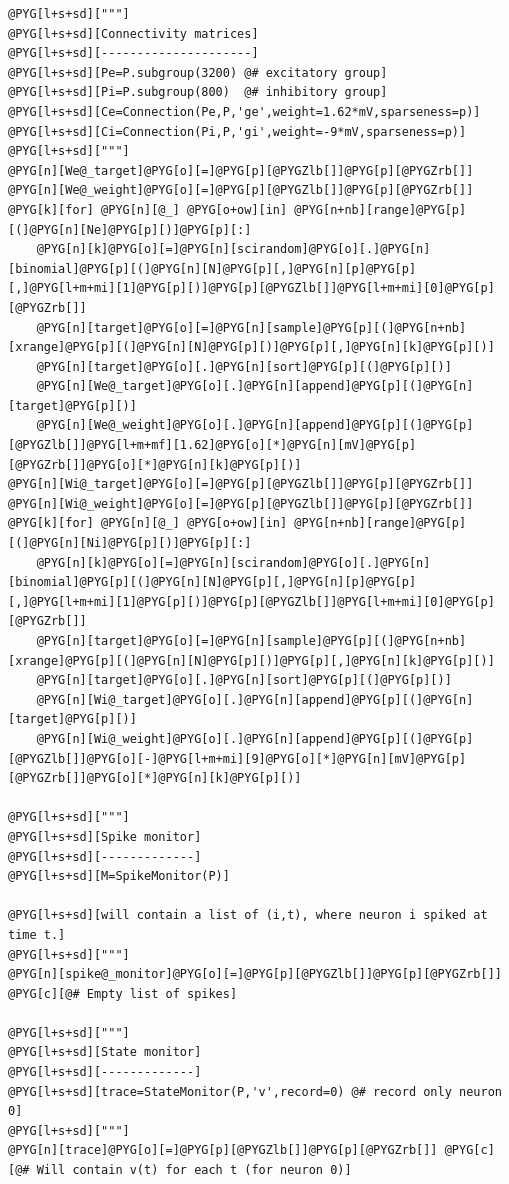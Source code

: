 \documentclass[letterpaper,10pt,english]{manual}
\begin{document}
\begin{Verbatim}[commandchars=@\[\]]
@PYG[l+s+sd]["""]
@PYG[l+s+sd][Connectivity matrices]
@PYG[l+s+sd][---------------------]
@PYG[l+s+sd][Pe=P.subgroup(3200) @# excitatory group]
@PYG[l+s+sd][Pi=P.subgroup(800)  @# inhibitory group]
@PYG[l+s+sd][Ce=Connection(Pe,P,'ge',weight=1.62*mV,sparseness=p)]
@PYG[l+s+sd][Ci=Connection(Pi,P,'gi',weight=-9*mV,sparseness=p)]
@PYG[l+s+sd]["""]
@PYG[n][We@_target]@PYG[o][=]@PYG[p][@PYGZlb[]]@PYG[p][@PYGZrb[]]
@PYG[n][We@_weight]@PYG[o][=]@PYG[p][@PYGZlb[]]@PYG[p][@PYGZrb[]]
@PYG[k][for] @PYG[n][@_] @PYG[o+ow][in] @PYG[n+nb][range]@PYG[p][(]@PYG[n][Ne]@PYG[p][)]@PYG[p][:]
    @PYG[n][k]@PYG[o][=]@PYG[n][scirandom]@PYG[o][.]@PYG[n][binomial]@PYG[p][(]@PYG[n][N]@PYG[p][,]@PYG[n][p]@PYG[p][,]@PYG[l+m+mi][1]@PYG[p][)]@PYG[p][@PYGZlb[]]@PYG[l+m+mi][0]@PYG[p][@PYGZrb[]]
    @PYG[n][target]@PYG[o][=]@PYG[n][sample]@PYG[p][(]@PYG[n+nb][xrange]@PYG[p][(]@PYG[n][N]@PYG[p][)]@PYG[p][,]@PYG[n][k]@PYG[p][)]
    @PYG[n][target]@PYG[o][.]@PYG[n][sort]@PYG[p][(]@PYG[p][)]
    @PYG[n][We@_target]@PYG[o][.]@PYG[n][append]@PYG[p][(]@PYG[n][target]@PYG[p][)]
    @PYG[n][We@_weight]@PYG[o][.]@PYG[n][append]@PYG[p][(]@PYG[p][@PYGZlb[]]@PYG[l+m+mf][1.62]@PYG[o][*]@PYG[n][mV]@PYG[p][@PYGZrb[]]@PYG[o][*]@PYG[n][k]@PYG[p][)]
@PYG[n][Wi@_target]@PYG[o][=]@PYG[p][@PYGZlb[]]@PYG[p][@PYGZrb[]]
@PYG[n][Wi@_weight]@PYG[o][=]@PYG[p][@PYGZlb[]]@PYG[p][@PYGZrb[]]
@PYG[k][for] @PYG[n][@_] @PYG[o+ow][in] @PYG[n+nb][range]@PYG[p][(]@PYG[n][Ni]@PYG[p][)]@PYG[p][:]
    @PYG[n][k]@PYG[o][=]@PYG[n][scirandom]@PYG[o][.]@PYG[n][binomial]@PYG[p][(]@PYG[n][N]@PYG[p][,]@PYG[n][p]@PYG[p][,]@PYG[l+m+mi][1]@PYG[p][)]@PYG[p][@PYGZlb[]]@PYG[l+m+mi][0]@PYG[p][@PYGZrb[]]
    @PYG[n][target]@PYG[o][=]@PYG[n][sample]@PYG[p][(]@PYG[n+nb][xrange]@PYG[p][(]@PYG[n][N]@PYG[p][)]@PYG[p][,]@PYG[n][k]@PYG[p][)]
    @PYG[n][target]@PYG[o][.]@PYG[n][sort]@PYG[p][(]@PYG[p][)]
    @PYG[n][Wi@_target]@PYG[o][.]@PYG[n][append]@PYG[p][(]@PYG[n][target]@PYG[p][)]
    @PYG[n][Wi@_weight]@PYG[o][.]@PYG[n][append]@PYG[p][(]@PYG[p][@PYGZlb[]]@PYG[o][-]@PYG[l+m+mi][9]@PYG[o][*]@PYG[n][mV]@PYG[p][@PYGZrb[]]@PYG[o][*]@PYG[n][k]@PYG[p][)]

@PYG[l+s+sd]["""]
@PYG[l+s+sd][Spike monitor]
@PYG[l+s+sd][-------------]
@PYG[l+s+sd][M=SpikeMonitor(P)]

@PYG[l+s+sd][will contain a list of (i,t), where neuron i spiked at time t.]
@PYG[l+s+sd]["""]
@PYG[n][spike@_monitor]@PYG[o][=]@PYG[p][@PYGZlb[]]@PYG[p][@PYGZrb[]] @PYG[c][@# Empty list of spikes]

@PYG[l+s+sd]["""]
@PYG[l+s+sd][State monitor]
@PYG[l+s+sd][-------------]
@PYG[l+s+sd][trace=StateMonitor(P,'v',record=0) @# record only neuron 0]
@PYG[l+s+sd]["""]
@PYG[n][trace]@PYG[o][=]@PYG[p][@PYGZlb[]]@PYG[p][@PYGZrb[]] @PYG[c][@# Will contain v(t) for each t (for neuron 0)]


\end{Verbatim}
\end{document}
